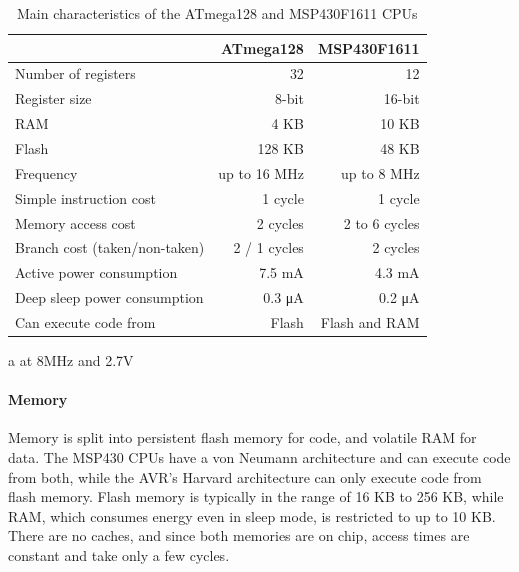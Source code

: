 \begin{table}
\caption{Main characteristics of the ATmega128 and MSP430F1611 CPUs}
\label{tbl-ATmega128-msp430f1611}
    \begin{threeparttable}
    \begin{tabular}{lrr} %
    \toprule
                                           & ATmega128 \cite{Atmel:ATmega128Datasheet, Atmel:AVRInstructionSetManual}   & MSP430F1611 \cite{TexasInstrumentsIncorporated:MSP430F1611Datasheet, TexasInstrumentsIncorporated:MSP430x1xxUsersGuide} \\
    \midrule
    \midrule
    Number of registers                    & 32           & 12            \\
    Register size                          & 8-bit        & 16-bit        \\
    RAM                                    & 4 KB         & 10 KB         \\
    Flash                                  & 128 KB       & 48 KB         \\
    Frequency                              & up to 16 MHz & up to 8 MHz   \\
    Simple instruction cost                & 1 cycle      & 1 cycle       \\
    Memory access cost                     & 2 cycles     & 2 to 6 cycles \\
    Branch cost (taken/non-taken)          & 2 / 1 cycles & 2 cycles      \\
    Active power consumption\tnote{a}      & 7.5 mA       & 4.3 mA        \\ %
    Deep sleep power consumption           & 0.3 μA       & 0.2 μA        \\
    Can execute code from                  & Flash        & Flash and RAM \\
    \bottomrule
    \end{tabular}
    \begin{tablenotes}
        \item[a] at 8MHz and 2.7V
    \end{tablenotes}
    \end{threeparttable}
\end{table}

\paragraph{Memory}
Memory is split into persistent flash memory for code, and volatile RAM for data. The MSP430 CPUs have a von Neumann architecture and can execute code from both, while the AVR's Harvard architecture can only execute code from flash memory. Flash memory is typically in the range of 16 KB to 256 KB, while RAM, which consumes energy even in sleep mode, is restricted to up to 10 KB. There are no caches, and since both memories are on chip, access times are constant and take only a few cycles.

